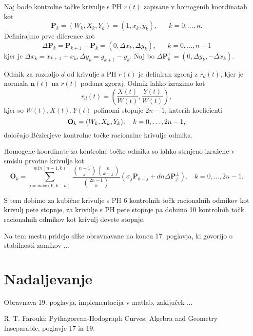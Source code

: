 \documentclass[a4paper]{article}
\begin{document}
	Naj bodo kontrolne točke krivulje s PH $r (t)$ zapisane v homogenih koordinatah kot
	$$\textbf{P}_k = (W_k, X_k, Y_k) = (1, x_k, y_k),\hspace{20pt} k = 0,\ldots , n.$$
	Definirajmo prve diference kot
	$$\Delta\textbf{P}_k = \textbf{P}_{k + 1} - \textbf{P}_k = (0, \Delta x_k, \Delta y_k),\hspace{20pt} k = 0,\ldots, n - 1$$
	kjer je $\Delta x_k = x_{k + 1}- x_k, \Delta y_k = y_{k + 1}- y_k$. Naj bo $\Delta\textbf{P}_k^\perp = (0, \Delta y_k, -\Delta x_k).$
	
	Odmik za razdaljo $d$ od krivulje s PH $r (t)$ je definiran zgoraj z $r_d(t)$, kjer je normala $\textbf{n}(t)$ na $r (t)$ podana zgoraj. Odmik lahko izrazimo kot
	$$r_d (t) = \left(\frac{X (t)}{W(t)},\frac{Y(t)}{W(t)}\right),$$
	kjer so $W (t), X (t), Y (t)$ polinomi stopnje $2n - 1$, katerih koeficienti
	$$\textbf{O}_k = (W_k, X_k, Y_k), \hspace{10px} k = 0,\ldots , 2n - 1,$$
	določajo B\'ezierjeve kontrolne točke racionalne krivulje odmika.
	
	Homogene koordinate za kontrolne točke odmika so lahko strnjeno izražene v smislu prvotne krivulje kot
	$$\textbf{O}_k =\sum^{min (n - 1, k)}_{j = max (0, k - n)}\frac{\binom{n-1}{j}\binom{n}{k-j}}{\binom{2n-1}{k}}(\sigma_j\textbf{P}_{k-j}+dn\Delta\textbf{P}_j^\perp), \hspace{10pt} k = 0,\ldots, 2n - 1.$$
	
	S tem dobimo za kubične krivulje s PH 6 kontrolnih točk racionalnih odmikov kot krivulj pete stopnje, za krivulje s PH pete stopnje pa dobimo 10 kontrolnih točk racionalnih odmikov kot krivulj devete stopnje.
	
	\vspace{90pt}
	Na tem mestu pridejo slike obravnavane na koncu 17. poglavja, ki govorijo o stabilnosti zamikov ...
	
	\section{Nadaljevanje}
	Obravnava 19. poglavja, implementacija v matlab, zaključek ...
	
	\begin{thebibliography}{1}
		 R. T. Farouki: Pythagorean-Hodograph Curves: Algebra and Geometry Inseparable, poglavje 17 in 19.
	\end{thebibliography}
\end{document}
